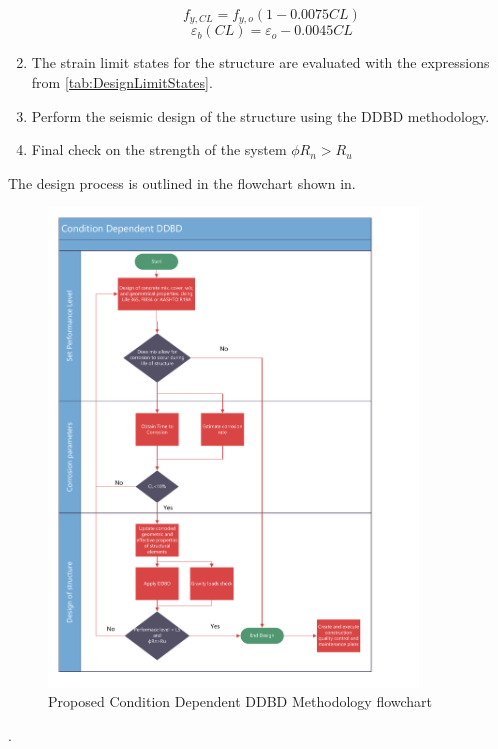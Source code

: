 \begin{enumerate}
    \begin{equation}
        f_{y,CL} = f_{y,o}(1-0.0075CL)
        \label{eq.Calderon_Fy_vs_CL_06}
    \end{equation}
    \begin{equation}
        \varepsilon_{b}(CL) = \varepsilon_{o}-0.0045CL
        \label{eq.Calderon_eb_vs_CL_06}
    \end{equation}
    \item The strain limit states for the structure are evaluated with the expressions from \ref{tab:DesignLimitStates}.
    \item Perform the seismic design of the structure using the DDBD methodology.
    \item Final check on the strength of the system $\phi R_{n}>R_{u}$
\end{enumerate}

The design process is outlined in the flowchart shown in.

\begin{figure}[htbp]
	\centering
	\includegraphics[width=0.875\textwidth]{VAC Thesis 2.0/Chapter-6/figs/CD_DDBD_VictorCalderon.pdf}
	\caption{Proposed Condition Dependent DDBD Methodology flowchart}
	\label{fig:CD-DDBD_CH6}
\end{figure}. 


